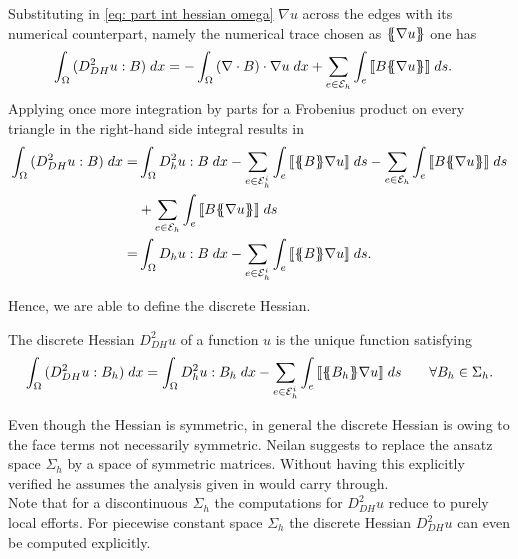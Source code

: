 Substituting in \eqref{eq: part int hessian omega} $\nabla u$ across the edges with its numerical counterpart, namely the numerical trace chosen as $\{\!\!\{ \nabla u \}\!\!\}$ one has
	\begin{align}
		\int_{\Omega} {{ (D_{DH}^2 u : B) }\;dx}
		&= - \int_{\Omega} {{ \left(\nabla \cdot B\right) \cdot \nabla u}\;dx}
				+ \sum_{ e \in \mathcal{E}_h} \int_{e} {{  \llbracket B \{\!\!\{ \nabla u \}\!\!\}  \rrbracket}\;ds}.	
	\end{align}
Applying once more integration by parts for a Frobenius product on every triangle in the right-hand side integral results in
	\begin{align}
		\myIntX  \Omega { (D_{DH}^2 u : B) }
		=& \myIntX  \Omega { D^2_h u: B }
			-\sum_{ e \in \edgesi} \myIntS e {  \jump {\average B  \nabla u }}
			- \sum_{ e \in \edges} \myIntS e { \jump {B \average {\nabla u} }}\nonumber \\		
			&+ \sum_{ e \in \edges} \myIntS e {  \jump {B \average {\nabla u} }}		\nonumber \\
		=& \myIntX  \Omega { D_h u: B}
			 -\sum_{ e \in \edgesi} \myIntS e {  \jump {\average B  \nabla u }	}.
	\end{align}

Hence, we are able to define the discrete Hessian.
\begin{definition} \label{def: discrete Hessian}
	The discrete Hessian $D_{DH}^2 u$ of a function $u$ is the unique function satisfying
	\begin{align}
		\int_{\Omega} {{ (D_{DH}^2 u : B_h) }\;dx}
		= \int_{\Omega} {{ D^2_h u: B_h}\;dx}
			 -\sum_{ e \in \mathcal{E}_h^i} \int_{e} {{  \llbracket \{\!\!\{ B_h \}\!\!\} \nabla u  \rrbracket}\;ds}\qquad \forall B_h \in \Sigma_h. \label{eq: discrete hessian}
	\end{align}
\end{definition}

Even though the Hessian is symmetric, in general the discrete Hessian is owing to the face terms not necessarily symmetric. Neilan suggests to replace the ansatz space $\Sigma_h$ by a space of symmetric matrices. Without having this explicitly verified he assumes the analysis given in \cite{Neilan2014} would carry through.\\
Note that for a discontinuous $\Sigma_h$ the computations for $D_{DH}^2 u$ reduce to purely local efforts. For piecewise constant space $\Sigma_h$ the discrete Hessian $D_{DH}^2 u$ can even be computed explicitly.

